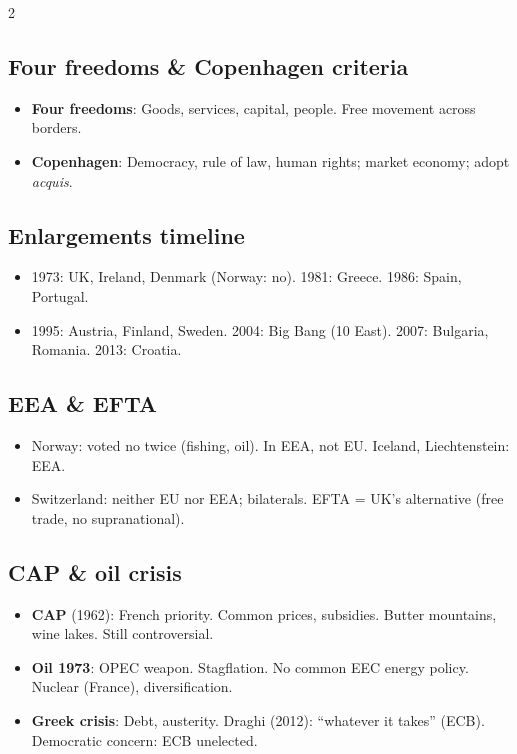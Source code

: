 \documentclass[8pt,landscape,a4paper]{article}
\begin{document}
\begin{multicols}{2}
\subsection*{Four freedoms \& Copenhagen criteria}
\begin{itemize}[leftmargin=*,nosep]
\item \textbf{Four freedoms}: Goods, services, capital, people. Free movement across borders.
\item \textbf{Copenhagen}: Democracy, rule of law, human rights; market economy; adopt \textit{acquis}.
\end{itemize}

\subsection*{Enlargements timeline}
\begin{itemize}[leftmargin=*,nosep]
\item 1973: UK, Ireland, Denmark (Norway: no). 1981: Greece. 1986: Spain, Portugal.
\item 1995: Austria, Finland, Sweden. 2004: Big Bang (10 East). 2007: Bulgaria, Romania. 2013: Croatia.
\end{itemize}

\subsection*{EEA \& EFTA}
\begin{itemize}[leftmargin=*,nosep]
\item Norway: voted no twice (fishing, oil). In EEA, not EU. Iceland, Liechtenstein: EEA.
\item Switzerland: neither EU nor EEA; bilaterals. EFTA = UK's alternative (free trade, no supranational).
\end{itemize}

\subsection*{CAP \& oil crisis}
\begin{itemize}[leftmargin=*,nosep]
\item \textbf{CAP} (1962): French priority. Common prices, subsidies. Butter mountains, wine lakes. Still controversial.
\item \textbf{Oil 1973}: OPEC weapon. Stagflation. No common EEC energy policy. Nuclear (France), diversification.
\item \textbf{Greek crisis}: Debt, austerity. Draghi (2012): ``whatever it takes'' (ECB). Democratic concern: ECB unelected.
\end{itemize}


\end{multicols}
\end{document}
